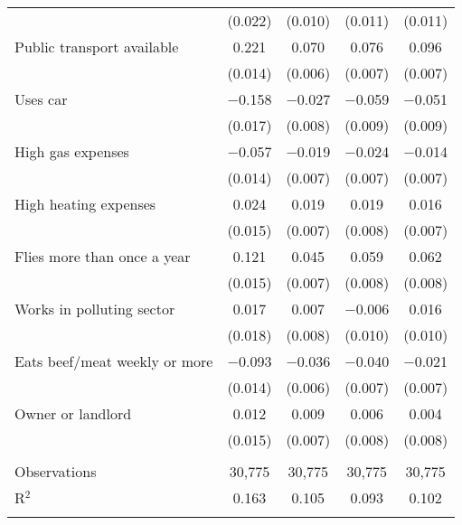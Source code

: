 \begin{tabular}{@{\extracolsep{5pt}}lcccc}
  & (0.022) & (0.010) & (0.011) & (0.011) \\ 
  Public transport available & 0.221 & 0.070 & 0.076 & 0.096 \\ 
  & (0.014) & (0.006) & (0.007) & (0.007) \\ 
  Uses car & $-$0.158 & $-$0.027 & $-$0.059 & $-$0.051 \\ 
  & (0.017) & (0.008) & (0.009) & (0.009) \\ 
  High gas expenses & $-$0.057 & $-$0.019 & $-$0.024 & $-$0.014 \\ 
  & (0.014) & (0.007) & (0.007) & (0.007) \\ 
  High heating expenses & 0.024 & 0.019 & 0.019 & 0.016 \\ 
  & (0.015) & (0.007) & (0.008) & (0.007) \\ 
  Flies more than once a year & 0.121 & 0.045 & 0.059 & 0.062 \\ 
  & (0.015) & (0.007) & (0.008) & (0.008) \\ 
  Works in polluting sector & 0.017 & 0.007 & $-$0.006 & 0.016 \\ 
  & (0.018) & (0.008) & (0.010) & (0.010) \\ 
  Eats beef/meat weekly or more & $-$0.093 & $-$0.036 & $-$0.040 & $-$0.021 \\ 
  & (0.014) & (0.006) & (0.007) & (0.007) \\ 
  Owner or landlord & 0.012 & 0.009 & 0.006 & 0.004 \\ 
  & (0.015) & (0.007) & (0.008) & (0.008) \\ 
 \hline \\[-1.8ex] 

Observations & 30,775 & 30,775 & 30,775 & 30,775 \\ 
R$^{2}$ & 0.163 & 0.105 & 0.093 & 0.102 \\ 
\hline 
\hline \\[-1.8ex] 
\end{tabular} 
